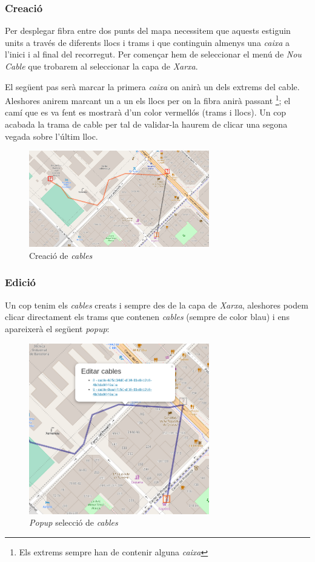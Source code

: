 \documentclass[a4paper]{article}
\begin{document}
	\subsubsection{Creació}
	Per desplegar fibra entre dos punts del mapa necessitem que aquests estiguin units a través de diferents llocs i trams i que continguin almenys una \emph{caixa} a l'inici i al final del recorregut.
	Per començar hem de seleccionar el menú de \emph{Nou Cable} que trobarem al seleccionar la capa de \emph{Xarxa}.
	
	El següent pas serà marcar la primera \emph{caixa} on anirà un dels extrems del cable. Aleshores anirem marcant un a un els llocs per on la fibra anirà passant \footnote{Els extrems sempre han de contenir alguna \emph{caixa}}; el camí que es va fent es mostrarà d'un color vermellós (trams i llocs). Un cop acabada la trama de cable per tal de validar-la haurem de clicar una segona vegada sobre l'últim lloc.
	
	\begin{figure}[H]
		\centering
		\includegraphics[width=0.7\textwidth]{images/cable_creation.png}
		\caption{Creació de \emph{cables}}
	\end{figure}
	
	\subsubsection{Edició}
	
	Un cop tenim els \emph{cables} creats i sempre des de la capa de \emph{Xarxa}, aleshores podem clicar directament els trams que contenen \emph{cables} (sempre de color blau) i ens apareixerà el següent \emph{popup}:
	
	\begin{figure}[H]
		\centering
		\includegraphics[width=0.7\textwidth]{images/cable_edit_popup.png}
		\caption{\emph{Popup} selecció de \emph{cables}}
	\end{figure}
	
\end{document}
